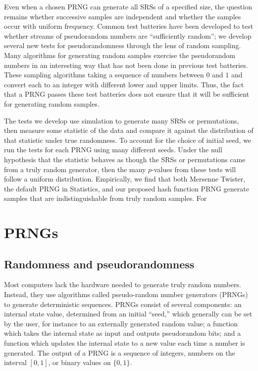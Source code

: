 \documentclass[12pt]{article}
\newcommand{\todo}[1]{{\color{red}{TO DO: \sc #1}}}
\begin{document}
Even when a chosen PRNG can generate all SRSs of a specified size, the question remains whether successive samples are independent and whether the samples occur with uniform frequency.
Common test batteries have been developed to test whether streams of pseudorandom numbers are ``sufficiently random''; we develop several new tests for pseudorandomness through the lens of random sampling.
Many algorithms for generating random samples exercise the pseudorandom numbers in an interesting way that has not been done in previous test batteries.
These sampling algorithms taking a sequence of numbers between $0$ and $1$ and convert each to an integer with different lower and upper limits.
Thus, the fact that a PRNG passes these test batteries does not ensure that it will be sufficient for generating random samples.

The tests we develop use simulation to generate many SRSs or permutations, then measure some statistic of the data and compare it against the distribution of that statistic under true randomness.
To account for the choice of initial seed, we run the tests for each PRNG using many different seeds.
Under the null hypothesis that the statistic behaves as though the SRSs or permutations came from a truly random generator, then the many $p$-values from these tests will follow a uniform distribution.
Empirically, we find that both Mersenne Twister, the default PRNG in Statistics, and our proposed hash function PRNG generate samples that are indistinguishable from truly random samples.
For 

\todo{The paper is organized as follows. }






\section{PRNGs}\label{sec:prngs}
\subsection{Randomness and pseudorandomness}
Most computers lack the hardware needed to generate truly random numbers. 
Instead, they use algorithms called pseudo-random number generators (PRNGs) to generate
deterministic sequences.
PRNGs consist of several components:
an internal state value, determined from an initial ``seed,'' which generally can be set by the user,
for instance to an externally generated random value;
a function which takes the internal state as input and outputs pseudorandom bits;
and a function which updates the internal state to a new value each time a number is generated.
The output of a PRNG is a sequence of integers, numbers on the interval $[0, 1]$, or binary values on $\{0, 1\}$.
\end{document}
